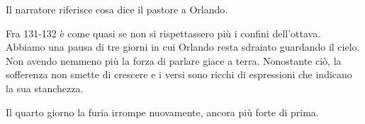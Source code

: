 \documentclass[a4paper]{article}
\begin{document}
\begin{center} %
\begin{minipage}{0.5\textwidth}
\centering
{}
\end{minipage}
\end{center}

\begin{center} %
\begin{minipage}{0.5\textwidth}
\centering
{}
\end{minipage}
\end{center}

Il narratore riferisce cosa dice il pastore a Orlando.


\begin{center} %
\begin{minipage}{0.5\textwidth}
\centering
{}
\end{minipage}
\end{center}

Fra 131-132 è come quasi se non si rispettassero più i confini dell'ottava.
Abbiamo una pausa di tre giorni in cui Orlando resta sdraiato guardando il cielo.
Non avendo nemmeno più la forza di parlare giace a terra.
Nonostante ciò, la sofferenza non smette di crescere e i versi sono ricchi di espressioni
che indicano la sua stanchezza.

Il quarto giorno la furia irrompe nuovamente, ancora più forte di prima.
\end{document}

